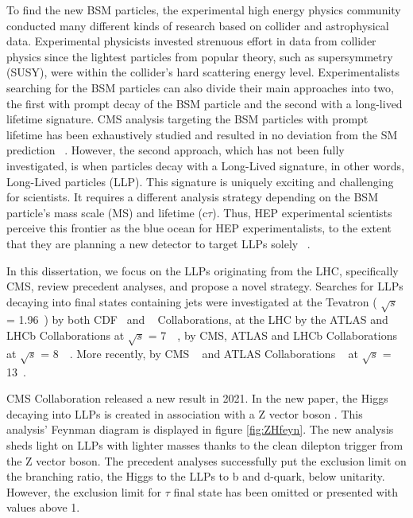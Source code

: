 To find the new BSM particles, the experimental high energy physics community conducted many different kinds of research based on collider and astrophysical data.
Experimental physicists invested strenuous effort in data from collider physics since the lightest particles from popular theory, such as supersymmetry (SUSY), were within the collider's hard scattering energy level.
Experimentalists searching for the BSM particles can also divide their main approaches into two, the first with prompt decay of the BSM particle and the second with a long-lived lifetime signature.
CMS analysis targeting the BSM particles with prompt lifetime has been exhaustively studied and resulted in no deviation from the SM prediction ~\cite{SUSY}.
However, the second approach, which has not been fully investigated, is when particles decay with a Long-Lived signature, in other words, Long-Lived particles (LLP).
This signature is uniquely exciting and challenging for scientists.
It requires a different analysis strategy depending on the BSM particle's mass scale (MS) and lifetime (c$\tau$).
Thus, HEP experimental scientists perceive this frontier as the blue ocean for HEP experimentalists, to the extent that they are planning a new detector to target LLPs solely ~\cite{Barron:2022aac}.

In this dissertation, we focus on the LLPs originating from the LHC, specifically CMS, review precedent analyses, and propose a novel strategy.
Searches for LLPs decaying into final states containing jets were investigated
at the Tevatron ( $\sqrt{s}$ = 1.96~\TeV) by both CDF~\cite{Aaltonen:2011rja} and \DZERO~\cite{Abazov:2009ik} Collaborations,
at the LHC by the ATLAS and LHCb Collaborations at $\sqrt{s}$ = 7~\TeV~\cite{ATLAS:2012av,Aaij:2014nma},
by CMS, ATLAS and LHCb Collaborations at $\sqrt{s}$ = 8~\TeV~\cite{Aad:2015uaa,Aad:2015rba,PhysRevD.91.012007,Aad:2015asa,Aaij:2017mic,Aaij:2016xmb,Aaij:2015ica}.
More recently, by CMS ~\cite{Sirunyan:2017jdo,displacedvertices,displacedjets2016,delayedjets,emergingjets,CMS-PAS-EXO-19-021}
 and ATLAS Collaborations ~\cite{Aaboud:2018iil,Aaboud:2018jbr,Aaboud:2018arf,Aaboud:2018aqj,Aaboud:2018kbe,Aaboud:2019trc,Aaboud:2019opc,Aad:2019kiz,Aad:2019pfm,Aad:2019tcc,Aad:2019xav,Aad:2019tua} at $\sqrt{s}$ = 13~\TeV.

CMS Collaboration released a new result in 2021.
In the new paper, the Higgs decaying into LLPs is created in association with a Z vector boson \cite{ZHAN}.
This analysis' Feynman diagram is displayed in figure \ref{fig:ZHfeyn}.
The new analysis sheds light on LLPs with lighter masses thanks to the clean dilepton trigger from the Z vector boson.
The precedent analyses successfully put the exclusion limit on the branching ratio, the Higgs to the LLPs to b and d-quark, below unitarity. 
However, the exclusion limit for $\tau$ final state has been omitted or presented with values above 1.

